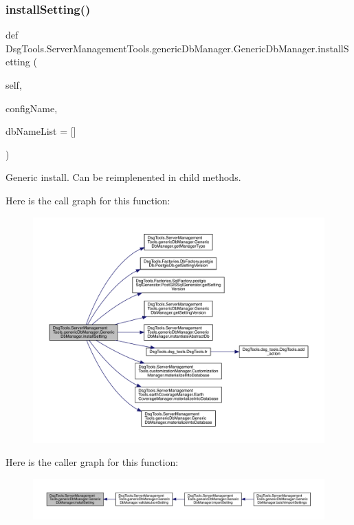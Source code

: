 \subsubsection{\texorpdfstring{install\+Setting()}{installSetting()}}
{\footnotesize\ttfamily def Dsg\+Tools.\+Server\+Management\+Tools.\+generic\+Db\+Manager.\+Generic\+Db\+Manager.\+install\+Setting (\begin{DoxyParamCaption}\item[{}]{self,  }\item[{}]{config\+Name,  }\item[{}]{db\+Name\+List = {\ttfamily \mbox{[}\mbox{]}} }\end{DoxyParamCaption})}

\begin{DoxyVerb}Generic install. Can be reimplenented in child methods.
\end{DoxyVerb}
 Here is the call graph for this function\+:
\nopagebreak
\begin{figure}[H]
\begin{center}
\leavevmode
\includegraphics[width=350pt]{class_dsg_tools_1_1_server_management_tools_1_1generic_db_manager_1_1_generic_db_manager_a6221e5ae58ee912401f15a9c6708bb25_cgraph}
\end{center}
\end{figure}
Here is the caller graph for this function\+:
\nopagebreak
\begin{figure}[H]
\begin{center}
\leavevmode
\includegraphics[width=350pt]{class_dsg_tools_1_1_server_management_tools_1_1generic_db_manager_1_1_generic_db_manager_a6221e5ae58ee912401f15a9c6708bb25_icgraph}
\end{center}
\end{figure}
